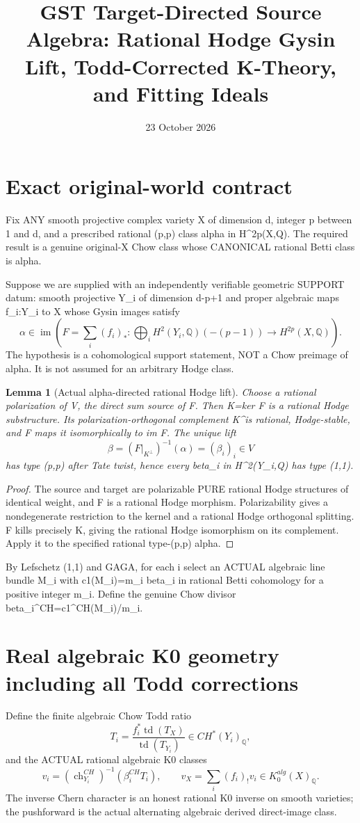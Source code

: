 \documentclass[11pt]{article}
\title{GST Target-Directed Source Algebra: Rational Hodge Gysin Lift, Todd-Corrected K-Theory, and Fitting Ideals}
\date{23 October 2026}
\newtheorem{lemma}[theorem]{Lemma}
\begin{document}
\maketitle
\section{Exact original-world contract}
Fix ANY smooth projective complex variety X of dimension d, integer p between 1 and d, and a prescribed rational (p,p) class alpha in H^{2p}(X,Q). The required result is a genuine original-X Chow class whose CANONICAL rational Betti class is alpha.

Suppose we are supplied with an independently verifiable geometric SUPPORT datum: smooth projective Y_i of dimension d-p+1 and proper algebraic maps f_i:Y_i to X whose Gysin images satisfy
\[
 \alpha\in\operatorname{im}\left(
 F=\sum_i(f_i)_*:
 \bigoplus_i H^2(Y_i,\mathbb Q)(-(p-1))
 \longrightarrow H^{2p}(X,\mathbb Q)\right).       \tag{1}
\]
The hypothesis is a cohomological support statement, NOT a Chow preimage of alpha. It is not assumed for an arbitrary Hodge class.

\begin{lemma}[Actual alpha-directed rational Hodge lift]
Choose a rational polarization of V, the direct sum source of F. Then K=ker F is a rational Hodge substructure. Its polarization-orthogonal complement K^\perp is rational, Hodge-stable, and F maps it isomorphically to im F. The unique lift
\[
 \boxed{\beta=(F|_{K^\perp})^{-1}(\alpha)
         =(\beta_i)_i\in V}                        \tag{2}
\]
has type (p,p) after Tate twist, hence every beta_i in H^2(Y_i,Q) has type (1,1).
\end{lemma}
\begin{proof}
The source and target are polarizable PURE rational Hodge structures of identical weight, and F is a rational Hodge morphism. Polarizability gives a nondegenerate restriction to the kernel and a rational Hodge orthogonal splitting. F kills precisely K, giving the rational Hodge isomorphism on its complement. Apply it to the specified rational type-(p,p) alpha.
\end{proof}

By Lefschetz (1,1) and GAGA, for each i select an ACTUAL algebraic line bundle M_i with c1(M_i)=m_i beta_i in rational Betti cohomology for a positive integer m_i. Define the genuine Chow divisor beta_i^CH=c1^CH(M_i)/m_i.

\section{Real algebraic K0 geometry including all Todd corrections}
Define the finite algebraic Chow Todd ratio
\[
 T_i=\frac{f_i^*\operatorname{td}(T_X)}
                  {\operatorname{td}(T_{Y_i})}
 \in CH^*(Y_i)_{\mathbb Q},                         \tag{3}
\]
and the ACTUAL rational algebraic K0 classes
\[
 v_i=(\operatorname{ch}_{Y_i}^{CH})^{-1}
                  (\beta_i^{CH} T_i),\qquad
 v_X=\sum_i(f_i)_!v_i\in K_0^{alg}(X)_{\mathbb Q}.   \tag{4}
\]
The inverse Chern character is an honest rational K0 inverse on smooth varieties; the pushforward is the actual alternating algebraic derived direct-image class.
\end{document}
